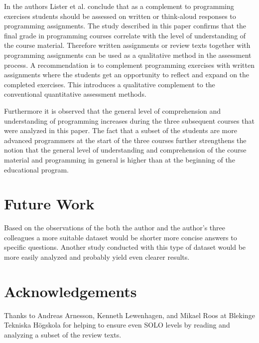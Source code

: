 \documentclass[twoside,twocolumn,a4paper,11pt,english]{article}
\begin{document}
In \cite{lister2006not} the authors Lister et al. conclude that as a complement to programming exercises students should be assessed on written or think-aloud responses to programming assignments. The study described in this paper confirms that the final grade in programming courses correlate with the level of understanding of the course material. Therefore written assignments or review texts together with programming assignments can be used as a qualitative method in the assessment process. A recommendation is to complement programming exercises with written assignments where the students get an opportunity to reflect and expand on the completed exercises. This introduces a qualitative complement to the conventional quantitative assessment methods.

Furthermore it is observed that the general level of comprehension and understanding of programming increases during the three subsequent courses that were analyzed in this paper. The fact that a subset of the students are more advanced programmers at the start of the three courses further strengthens the notion that the general level of understanding and comprehension of the course material and programming in general is higher than at the beginning of the educational program.




\section{Future Work}

Based on the observations of the both the author and the author's three colleagues a more suitable dataset would be shorter more concise answers to specific questions. Another study conducted with this type of dataset would be more easily analyzed and probably yield even clearer results.




\section{Acknowledgements}

Thanks to Andreas Arnesson, Kenneth Lewenhagen, and Mikael Roos at Blekinge Tekniska Högskola for helping to ensure even SOLO levels by reading and analyzing a subset of the review texts.
\end{document}

